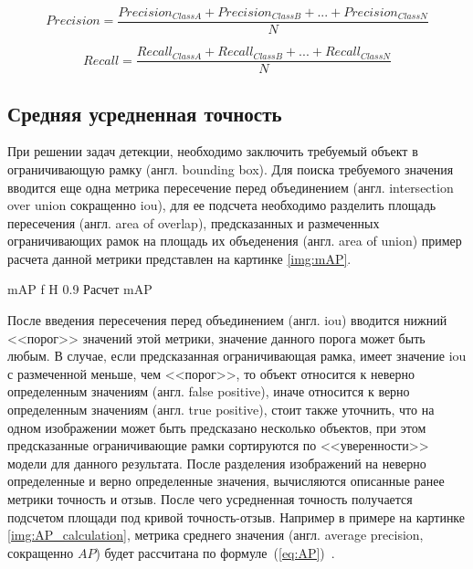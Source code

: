 \begin{equation}
\label{eq:precision}
Precision = \frac{Precision_{Class A} + Precision_{Class B} + ... + Precision_{Class N}}{N}
\end{equation}

\begin{equation}
\label{eq:recall}
Recall = \frac{Recall_{Class A} + Recall_{Class B} + ... + Recall_{Class N}}{N}
\end{equation}




\subsection{Средняя усредненная точность}
При решении задач детекции, необходимо заключить требуемый объект в ограничивающую рамку (англ. bounding box).
Для поиска требуемого значения вводится еще одна метрика пересечение перед объединением (англ. intersection over union сокращенно iou),
для ее подсчета необходимо разделить площадь пересечения (англ. area of overlap), предсказанных и  размеченных ограничивающих рамок на площадь их объеденения (англ. area of union)
пример расчета данной метрики представлен на картинке \ref{img:mAP}.

{mAP} %
{f} %
{H} %
{0.9\textwidth} %
{Расчет mAP} %


После введения пересечения перед объединением (англ. iou) вводится нижний <<порог>>  значений этой метрики, значение данного порога может быть любым. В случае, 
если предсказанная ограничивающая рамка, имеет значение iou с размеченной меньше, чем <<порог>>, то объект относится  к неверно определенным значениям (англ. false positive), 
иначе относится к верно определенным значениям (англ. true positive), стоит также уточнить, что на одном изображении может быть предсказано несколько объектов, при этом предсказанные ограничивающие рамки сортируются по <<уверенности>> модели для данного результата.
После разделения изображений на неверно определенные и верно определенные значения, вычисляются описанные ранее метрики точность и отзыв.
После чего усредненная точность получается подсчетом площади под кривой точность-отзыв. Например в примере на картинке \ref{img:AP_calculation}, метрика
среднего значения (англ. average precision, сокращенно $AP$) будет рассчитана по формуле~(\ref{eq:AP})~\cite{mAP}.

